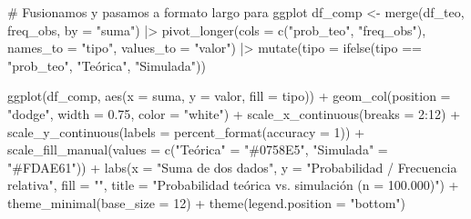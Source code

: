 \documentclass[
  spanish,
  letterpaper,
  DIV=11,
  numbers=noendperiod]{scrartcl}
\newenvironment{Shaded}{\begin{snugshade}}{\end{snugshade}}
\newcommand{\AttributeTok}[1]{\textcolor[rgb]{0.40,0.45,0.13}{#1}}
\newcommand{\CommentTok}[1]{\textcolor[rgb]{0.37,0.37,0.37}{#1}}
\newcommand{\DecValTok}[1]{\textcolor[rgb]{0.68,0.00,0.00}{#1}}
\newcommand{\FloatTok}[1]{\textcolor[rgb]{0.68,0.00,0.00}{#1}}
\newcommand{\FunctionTok}[1]{\textcolor[rgb]{0.28,0.35,0.67}{#1}}
\newcommand{\NormalTok}[1]{\textcolor[rgb]{0.00,0.23,0.31}{#1}}
\newcommand{\OtherTok}[1]{\textcolor[rgb]{0.00,0.23,0.31}{#1}}
\newcommand{\SpecialCharTok}[1]{\textcolor[rgb]{0.37,0.37,0.37}{#1}}
\newcommand{\StringTok}[1]{\textcolor[rgb]{0.13,0.47,0.30}{#1}}
\begin{document}
\begin{Shaded}
\begin{Highlighting}[]
\CommentTok{\# Fusionamos y pasamos a formato largo para ggplot}
\NormalTok{df\_comp }\OtherTok{\textless{}{-}} \FunctionTok{merge}\NormalTok{(df\_teo, freq\_obs, }\AttributeTok{by =} \StringTok{"suma"}\NormalTok{) }\SpecialCharTok{|\textgreater{}}
  \FunctionTok{pivot\_longer}\NormalTok{(}\AttributeTok{cols =} \FunctionTok{c}\NormalTok{(}\StringTok{"prob\_teo"}\NormalTok{, }\StringTok{"freq\_obs"}\NormalTok{),}
               \AttributeTok{names\_to =} \StringTok{"tipo"}\NormalTok{, }\AttributeTok{values\_to =} \StringTok{"valor"}\NormalTok{) }\SpecialCharTok{|\textgreater{}}
  \FunctionTok{mutate}\NormalTok{(}\AttributeTok{tipo =} \FunctionTok{ifelse}\NormalTok{(tipo }\SpecialCharTok{==} \StringTok{"prob\_teo"}\NormalTok{, }\StringTok{"Teórica"}\NormalTok{, }\StringTok{"Simulada"}\NormalTok{))}

\FunctionTok{ggplot}\NormalTok{(df\_comp, }\FunctionTok{aes}\NormalTok{(}\AttributeTok{x =}\NormalTok{ suma, }\AttributeTok{y =}\NormalTok{ valor, }\AttributeTok{fill =}\NormalTok{ tipo)) }\SpecialCharTok{+}
  \FunctionTok{geom\_col}\NormalTok{(}\AttributeTok{position =} \StringTok{"dodge"}\NormalTok{, }\AttributeTok{width =} \FloatTok{0.75}\NormalTok{, }\AttributeTok{color =} \StringTok{"white"}\NormalTok{) }\SpecialCharTok{+}
  \FunctionTok{scale\_x\_continuous}\NormalTok{(}\AttributeTok{breaks =} \DecValTok{2}\SpecialCharTok{:}\DecValTok{12}\NormalTok{) }\SpecialCharTok{+}
  \FunctionTok{scale\_y\_continuous}\NormalTok{(}\AttributeTok{labels =} \FunctionTok{percent\_format}\NormalTok{(}\AttributeTok{accuracy =} \DecValTok{1}\NormalTok{)) }\SpecialCharTok{+}
  \FunctionTok{scale\_fill\_manual}\NormalTok{(}\AttributeTok{values =} \FunctionTok{c}\NormalTok{(}\StringTok{"Teórica"} \OtherTok{=} \StringTok{"\#0758E5"}\NormalTok{,}
                               \StringTok{"Simulada"} \OtherTok{=} \StringTok{"\#FDAE61"}\NormalTok{)) }\SpecialCharTok{+}
  \FunctionTok{labs}\NormalTok{(}\AttributeTok{x =} \StringTok{"Suma de dos dados"}\NormalTok{,}
       \AttributeTok{y =} \StringTok{"Probabilidad / Frecuencia relativa"}\NormalTok{,}
       \AttributeTok{fill =} \StringTok{""}\NormalTok{,}
       \AttributeTok{title =} \StringTok{"Probabilidad teórica vs. simulación (n = 100.000)"}\NormalTok{) }\SpecialCharTok{+}
  \FunctionTok{theme\_minimal}\NormalTok{(}\AttributeTok{base\_size =} \DecValTok{12}\NormalTok{) }\SpecialCharTok{+}
  \FunctionTok{theme}\NormalTok{(}\AttributeTok{legend.position =} \StringTok{"bottom"}\NormalTok{)}
\end{Highlighting}
\end{Shaded}
\end{document}
